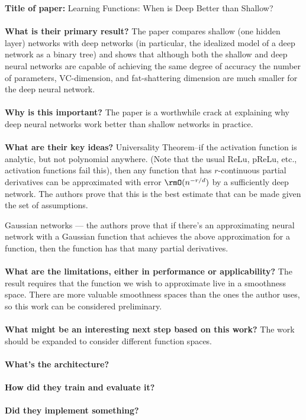 \noindent\textbf{\large Title of paper:} Learning Functions: When is Deep
Better than Shallow?
\\\\
\textbf{\large What is their primary result?} The paper compares shallow (one
hidden layer) networks with deep networks (in particular, the idealized model of
a deep network as a binary tree) and shows that although both the shallow and
deep neural networks are capable of achieving the same degree of accuracy the
number of parameters, VC-dimension, and fat-shattering dimension are much
smaller for the deep neural network.
\\\\
\textbf{\large Why is this important?}
The paper is a worthwhile crack at explaining why deep neural networks work better than shallow networks in practice.
\\\\
\textbf{\large What are their key ideas?}
Universality Theorem--if the activation function is analytic, but not polynomial
anywhere. (Note that the usual ReLu, pReLu, etc., activation functions fail
this), then any function that has $r$-continuous partial derivatives can be
approximated with error $\rmO(n^{-r/d})$  by a sufficiently deep network. The
authors prove that this is the best estimate that can be made given the set of
assumptions.

Gaussian networks --- the authors prove that if there's an approximating neural
network with a Gaussian function that achieves the above approximation for a
function, then the function has that many partial derivatives. 
\\\\
\textbf{\large What are the limitations, either in performance or
  applicability?} The result requires that the function we wish to approximate
live in a smoothness space. There are more valuable smoothness spaces than the
ones the author uses, so this work can be considered preliminary. 
\\\\
\textbf{\large What might be an interesting next step based on this
  work?} The work should be expanded to consider different function spaces.
\\\\
\textbf{\large What's the architecture?}
\\\\
\textbf{\large How did they train and evaluate it?}
\\\\
\textbf{\large Did they implement something?}
\\\\

